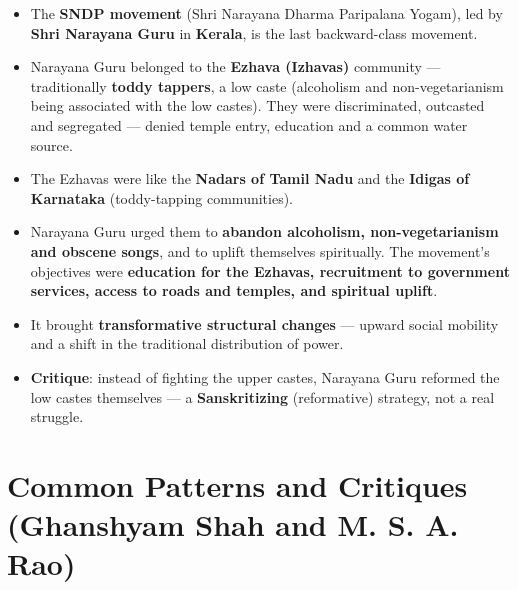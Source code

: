 \begin{KeyConcept}
\begin{itemize}
\item The \textbf{SNDP movement} (Shri Narayana Dharma Paripalana Yogam), led by \textbf{Shri Narayana Guru} in \textbf{Kerala}, is the last backward-class movement.
\item Narayana Guru belonged to the \textbf{Ezhava (Izhavas)} community --- traditionally \textbf{toddy tappers}, a low caste (alcoholism and non-vegetarianism being associated with the low castes). They were discriminated, outcasted and segregated --- denied temple entry, education and a common water source.
\item The Ezhavas were like the \textbf{Nadars of Tamil Nadu} and the \textbf{Idigas of Karnataka} (toddy-tapping communities).
\item Narayana Guru urged them to \textbf{abandon alcoholism, non-vegetarianism and obscene songs}, and to uplift themselves spiritually. The movement's objectives were \textbf{education for the Ezhavas, recruitment to government services, access to roads and temples, and spiritual uplift}.
\item It brought \textbf{transformative structural changes} --- upward social mobility and a shift in the traditional distribution of power.
\item \textbf{Critique}: instead of fighting the upper castes, Narayana Guru reformed the low castes themselves --- a \textbf{Sanskritizing} (reformative) strategy, not a real struggle.
\end{itemize}
\end{KeyConcept}

\section{Common Patterns and Critiques (Ghanshyam Shah and M. S. A. Rao)}

